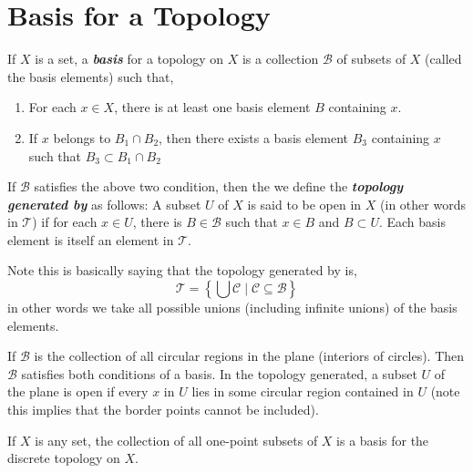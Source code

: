 \section{Basis for a Topology}
\begin{definition}
    If $X$ is a set, a \textbf{\emph{basis}} for a topology on $X$ is a collection $\mathcal{B}$ of subsets of $X$ (called the basis elements) such that, 
    \begin{enumerate}
        \item For each $x \in X$, there is at least one basis element $B$ containing $x$.
        \item If $x$ belongs to $B_{1} \cap B_{2}$, then there exists a basis element $B_{3}$ containing $x$ such that $B_{3} \subset B_{1} \cap B_{2}$
    \end{enumerate}
\end{definition}
\begin{remark}
    If $\mathcal{B}$ satisfies the above two condition, then the we define the \textbf{\emph{topology  generated by }} as follows: A subset $U$ of $X$ is said to be open in $X$ (in other words in $\mathcal{T}$) if for each $x \in U$, there is $B \in \mathcal{B}$ such that $x \in B$ and $B \subset U$. Each basis element is itself an element in $\mathcal{T}$.
    \vspace{1em}
    
    Note this is basically saying that the topology generated by  is, 
    \[
        \mathcal{T} = \left \{\bigcup \mathcal{C} \mid \mathcal{C} \subseteq \mathcal{B}\right \}
    \] 
    in other words we take all possible unions (including infinite unions) of the basis elements.
\end{remark}

\begin{eg}
    If $\mathcal{B}$ is the collection of all circular regions in the plane (interiors of circles). Then $\mathcal{B}$ satisfies both conditions of a basis. In the topology generated, a subset $U$ of the plane is open if every $x$ in $U$ lies in some circular region contained in $U$ (note this implies that the border points cannot be included).
\end{eg}
\begin{eg}
    If $X$ is any set, the collection of all one-point subsets of $X$ is a basis for the discrete topology on $X$.
\end{eg}

\vspace{1em}

